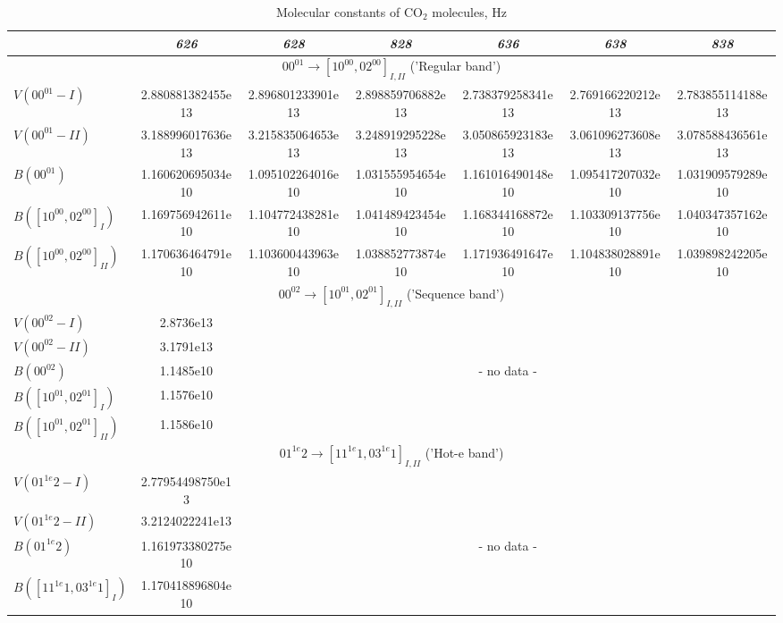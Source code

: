 \documentclass{report}
\begin{document}
\begin{table}
\centering
\caption{Molecular constants of CO$_2$ molecules, Hz}
\label{table:VB}
\footnotesize
\begin{tabular}{|l|cccccc|}
\hline
& \textit{626} & \textit{628} & \textit{828} & \textit{636} & \textit{638} & \textit{838}\\
\hline
\multicolumn{7}{|c|}{$00^01\rightarrow[10^00,02^00]_{I,II}$ ('Regular band')}\\
\hline
$V(00^01-I)$            & 2.880881382455e13 & 2.896801233901e13 & 2.898859706882e13 & 2.738379258341e13 & 2.769166220212e13 & 2.783855114188e13\\
$V(00^01-II)$           & 3.188996017636e13 & 3.215835064653e13 & 3.248919295228e13 & 3.050865923183e13 & 3.061096273608e13 & 3.078588436561e13\\
$B(00^01)$              & 1.160620695034e10 & 1.095102264016e10 & 1.031555954654e10 & 1.161016490148e10 & 1.095417207032e10 & 1.031909579289e10\\
$B([10^00,02^00]_I)$    & 1.169756942611e10 & 1.104772438281e10 & 1.041489423454e10 & 1.168344168872e10 & 1.103309137756e10 & 1.040347357162e10\\
$B([10^00,02^00]_{II})$ & 1.170636464791e10 & 1.103600443963e10 & 1.038852773874e10 & 1.171936491647e10 & 1.104838028891e10 & 1.039898242205e10\\
\hline
\multicolumn{7}{|c|}{$00^02\rightarrow[10^01,02^01]_{I,II}$ ('Sequence band')}\\
\hline
$V(00^02-I)$            & 2.8736e13 &  &  &  &  &\\
$V(00^02-II)$           & 3.1791e13 &  &  &  &  &\\
$B(00^02)$              & 1.1485e10 & \multicolumn{5}{c|}{- no data -}\\
$B([10^01,02^01]_I)$    & 1.1576e10 &  &  &  &  &\\
$B([10^01,02^01]_{II})$ & 1.1586e10 &  &  &  &  &\\
\hline
\multicolumn{7}{|c|}{$01^{1e}2\rightarrow[11^{1e}1,03^{1e}1]_{I,II}$ ('Hot-e band')}\\
\hline
$V(01^{1e}2-I)$               & 2.77954498750e13  &  &  &  &  &\\
$V(01^{1e}2-II)$              & 3.2124022241e13   &  &  &  &  &\\
$B(01^{1e}2)$                 & 1.161973380275e10 & \multicolumn{5}{c|}{- no data -}\\
$B([11^{1e}1,03^{1e}1]_I)$    & 1.170418896804e10 &  &  &  &  &\\

\end{tabular}
\end{table}
\end{document}
